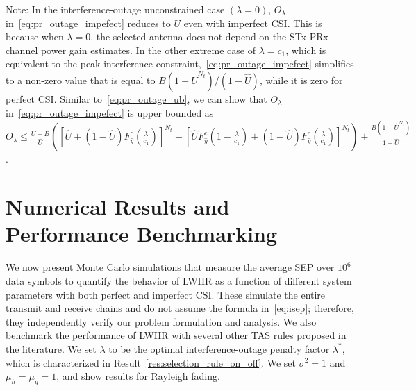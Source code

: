 \documentclass[12pt,draftcls,peerreview,onecolumn]{IEEEtran}
\newcommand{\lam}{\lambda}
\newcommand{\lamstar}{\lam^{*}}
\newcommand{\mug}{{\mu_{g}}}
\newcommand{\muh}{{\mu_{h}}}
\newcommand{\Nt}{{N_t}}
\newcommand{\puch}{g}
\newcommand{\noisevar}{\sigma^2}
\newcommand{\cone}{c_{1}}
\newcommand{\out}{O}
\newcommand{\lambym}{\frac{\lam}{\cone}}
\newcommand{\un}{U}
\newcommand{\outlam}{\out_{\lam}}
\newcommand{\unhat}{\widehat{\un}}
\newcommand{\ghat}{\hat{\puch}}
\newcommand{\yhat}{\hat{y}}
\newcommand{\gkhat}[1]{\ghat_{#1}}
\newcommand{\Probglt}{B}
\begin{document}
Note: In the interference-outage unconstrained case $\left(\lam=0\right)$, $\outlam$ in~\eqref{eq:pr_outage_impefect} reduces to $\un$ even with imperfect CSI. This is because when $\lam=0$, the selected antenna does not depend %
on the  STx-PRx channel power gain estimates. 
In the other extreme case of $\lam = \cone$, which is equivalent to the peak interference constraint,~\eqref{eq:pr_outage_impefect} simplifies to a non-zero value that is  equal to ${ \Probglt \left( 1-\unhat^{\Nt}\right) }/( {1-\unhat}) $, while it is zero for perfect CSI.   
Similar to~\eqref{eq:pr_outage_ub}, 
we can show that $\outlam$ in~\eqref{eq:pr_outage_impefect}  is upper bounded as 
$\outlam  \leq \frac{\un - \Probglt}{\unhat}\left( \left[\unhat + \left(1-\unhat\right)F_{\yhat}^{c}\left(\lambym\right)\right]^{\Nt} \!-\! \left[ \unhat F_{\yhat}^{c}\left(1-\lambym\right) + \left(1-\unhat\right)F_{\yhat}^{c}\left(\lambym\right)\right]^{\Nt}\right) +  \frac{ \Probglt \left( 1-\unhat^{\Nt}\right) }{1-\unhat}$.


\section{Numerical Results and Performance Benchmarking}
\label{sec:results}
We now present Monte Carlo simulations that measure the average SEP over $10^6$ data symbols %
to quantify the behavior of LWIIR as a function of different system parameters with both perfect and imperfect CSI. These simulate the entire transmit and receive chains and do not assume the formula in~\eqref{eq:isep}; therefore, they independently verify our problem formulation and analysis. We also benchmark the performance of LWIIR with several other TAS rules proposed in the literature. We set $\lam$ to be the optimal interference-outage penalty factor $\lamstar$, which is characterized in Result~\ref{res:selection_rule_on_off}. We set $\noisevar =1$ and $\muh =\mug = 1$, and show results for Rayleigh fading. 
\end{document}

